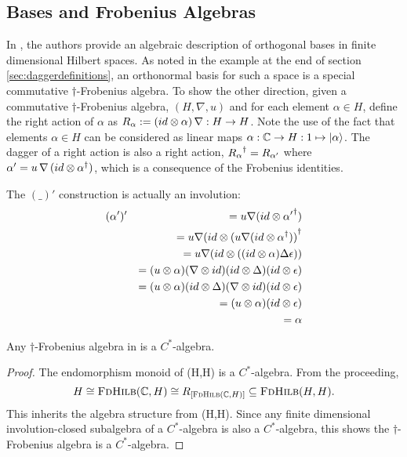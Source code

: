\subsection{Bases and Frobenius Algebras}\label{sec:basesandfrob}
In \cite{coeckeetal08:ortho}, the authors provide an algebraic description of orthogonal bases in
finite dimensional Hilbert spaces. As noted in the example at the end of section
\ref{sec:daggerdefinitions}, an orthonormal basis for such a space is a special commutative
$\dagger$-Frobenius algebra. To show the other direction, given a commutative $\dagger$-Frobenius
algebra, $(H,\nabla,u)$ and for each element $\alpha\in H$, define the right action of $\alpha$ as
$R_{\alpha}:=(id\otimes\alpha)\, \nabla:H\to H$. Note the use of the fact that elements $\alpha\in H$
can be considered as linear maps $\alpha:\mathbb{C} \to H:1\mapsto \left\vert{\alpha}\right\rangle$. The dagger of a right
action is also a right action, ${R_{\alpha}}^{\dagger} = R_{\alpha'}$ where $\alpha'= u\, \nabla\, (id\otimes
{\alpha}^{\dagger})$, which is a consequence of the Frobenius identities.

The $(\_)'$ construction is actually an involution:
\begin{eqnarray*}
  &(\alpha')' &= u \nabla (id \otimes {\alpha'}^{\dagger}) \\
  && = u \nabla (id \otimes {(u \nabla (id \otimes \ensuremath{{\alpha}^{\dagger}}))}^{\dagger}\\
  && = u \nabla (id \otimes ( (id \otimes \alpha) \Delta \epsilon))\\
  && = (u \otimes \alpha) (\nabla \otimes id) (id \otimes \Delta) (id \otimes  \epsilon)\\
  && = (u \otimes \alpha) (id \otimes \Delta) (\nabla \otimes id) (id \otimes  \epsilon)\\
  && = (u \otimes \alpha)  (id \otimes  \epsilon)\\
  && = \alpha
\end{eqnarray*}

\begin{lemma}\label{lemma:cstaralgebra}
  Any $\dagger$-Frobenius algebra in \fdh is a $C^{*}$-algebra.
\end{lemma}
\begin{proof}
  The endomorphism monoid of \fdh(H,H) is a $C^{*}$-algebra. From the proceeding,
  \[
    H \cong \textsc{FdHilb}(\mathbb{C},H) \cong R_{[\textsc{FdHilb}(\mathbb{C},H)]}\subseteq\textsc{FdHilb}(H,H).
  \]
  This inherits the algebra structure from \fdh(H,H). Since any finite dimensional
  involution-closed subalgebra of a $C^{*}$-algebra is also a $C^{*}$-algebra, this shows the
  $\dagger$-Frobenius algebra is a $C^{*}$-algebra.
\end{proof}

